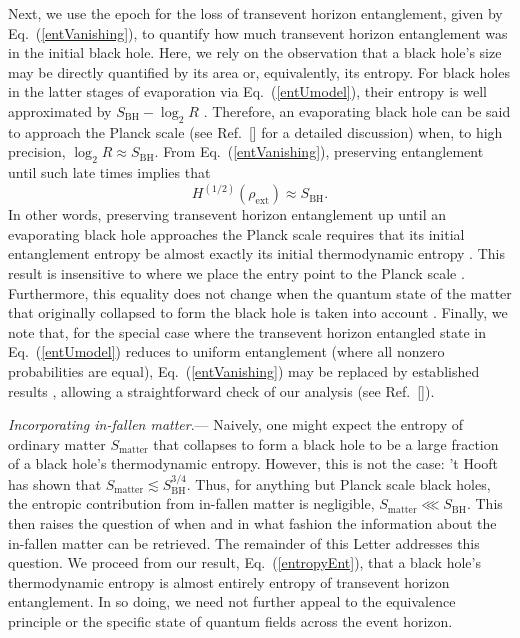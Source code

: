 \documentclass[twocolumn,aps,showpacs,prl]{revtex4}
\begin{document}
Next, we use the epoch for the loss of transevent horizon entanglement,
given by Eq.~(\ref{entVanishing}), to quantify how much transevent
horizon entanglement was in the initial black hole. Here, we rely on the
observation that a black hole's size may be directly quantified by its 
area or, equivalently, its entropy. 
For black holes in the latter stages of evaporation via
Eq.~(\ref{entUmodel}), their entropy is well approximated by
$S_{\text{BH}} - \log_2 R$ \cite{SM}. Therefore, an evaporating
black hole can be said to approach the Planck scale (see
Ref.~[] for a detailed discussion) when, to high
precision, $\log_2 R\approx S_{\text{BH}}$. From Eq.~(\ref{entVanishing}),
preserving entanglement until such late times implies that
\begin{equation}
H^{(1/2)}(\rho_{\text{ext}})\approx S_{\text{BH}}.
\label{entropyEnt}
\end{equation}
In other words, preserving transevent horizon entanglement up until
an evaporating black hole approaches the Planck scale requires that
its initial entanglement entropy be almost exactly its initial thermodynamic
entropy \cite{fnA}. This result is insensitive to where we place the
entry point to the Planck scale \cite{SM}. Furthermore, this equality
does not change when the quantum state of the matter that originally
collapsed to form the black hole is taken into account \cite{SM}.
Finally, we note that, for the special case where the transevent
horizon entangled state in Eq.~(\ref{entUmodel}) reduces to uniform
entanglement (where all nonzero probabilities are equal), 
Eq.~(\ref{entVanishing}) may be replaced by established results 
\cite{Hayden07}, allowing a straightforward check of our analysis
(see Ref.~[]).

{\it Incorporating in-fallen matter}.---%
Naively, one might expect the entropy of ordinary matter 
$S_{\text{matter}}$ that collapses to form a black hole to be a large 
fraction of a black hole's thermodynamic entropy. However, this is not 
the case: 't Hooft \cite{tHooft93} has shown that 
$S_{\text{matter}}\lesssim S_{\text{BH}}^{3/4}$. Thus, for anything but 
Planck scale black holes, the entropic contribution from in-fallen matter 
is negligible, $S_{\text{matter}}\lll S_{\text{BH}}$. This then raises
the question of when and in what fashion the information about the
in-fallen matter can be retrieved. The remainder of this Letter addresses
this question. We proceed from our result, Eq.~(\ref{entropyEnt}),
that a black hole's thermodynamic entropy is almost entirely entropy
of transevent horizon entanglement. In so doing, we need not further
appeal to the equivalence principle or the specific state of quantum
fields across the event horizon. 
\end{document}
